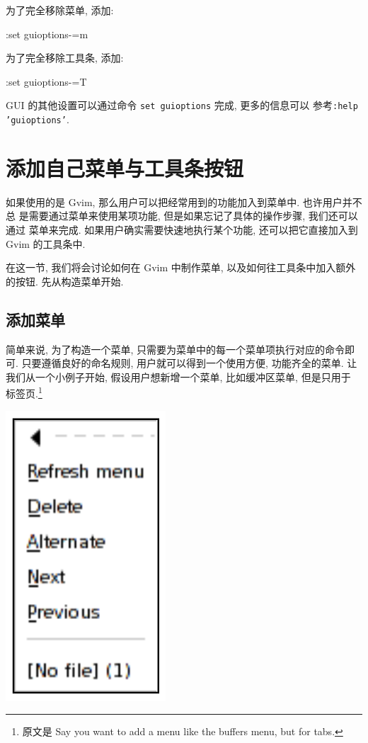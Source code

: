 为了完全移除菜单, 添加:
\begin{vimcmd}
:set guioptions-=m
\end{vimcmd}

为了完全移除工具条, 添加:
\begin{vimcmd}
:set guioptions-=T
\end{vimcmd}

\begin{warning}
    GUI 的其他设置可以通过命令 \texttt{set guioptions} 完成, 更多的信息可以
    参考\texttt{:help 'guioptions'}.
\end{warning}

\section{添加自己菜单与工具条按钮}
\label{sec:adding_your_own_menu_and_toolbar_buttons}
如果使用的是 Gvim, 那么用户可以把经常用到的功能加入到菜单中. 也许用户并不总
是需要通过菜单来使用某项功能, 但是如果忘记了具体的操作步骤, 我们还可以通过
菜单来完成. 如果用户确实需要快速地执行某个功能, 还可以把它直接加入到 Gvim
的工具条中.

在这一节, 我们将会讨论如何在 Gvim 中制作菜单, 以及如何往工具条中加入额外
的按钮. 先从构造菜单开始.

\subsection{添加菜单}
\label{subsec:adding_a_menu}
简单来说, 为了构造一个菜单, 只需要为菜单中的每一个菜单项执行对应的命令即可.
只要遵循良好的命名规则, 用户就可以得到一个使用方便, 功能齐全的菜单.
让我们从一个小例子开始, 假设用户想新增一个菜单, 比如缓冲区菜单, 但是只用于
标签页.\footnote{ 原文是 Say you want to add a menu like the buffers menu,
but for tabs.}

\begin{center}
\includegraphics[scale=0.42]{./images/page30.png}
\end{center}

